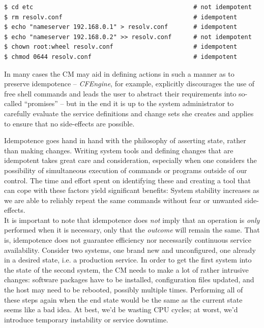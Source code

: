 \begin{lstlisting}[basicstyle=\scriptsize,float,label=code:cm:idempotence,caption={Idempotent and non-idempotent commands.}]
$ cd etc                                            # not idempotent
$ rm resolv.conf                                    # idempotent
$ echo "nameserver 192.168.0.1" > resolv.conf       # idempotent
$ echo "nameserver 192.168.0.2" >> resolv.conf      # not idempotent
$ chown root:wheel resolv.conf                      # idempotent
$ chmod 0644 resolv.conf                            # idempotent
\end{lstlisting}

In many cases the CM may aid in defining actions in
such a manner as to preserve idempotence -- {\em
CFEngine}, for example, explicitly discourages the use
of free shell commands and leads the user to abstract
their requirements into so-called
``promises''\cite{configuration-management:cfengine-manual}
-- but in the end it is up to the system administrator
to carefully evaluate the service definitions and
change sets she creates and applies to ensure that no
side-effects are possible.

Idempotence goes hand in hand with the philosophy of
asserting state, rather than making changes.  Writing
system tools and defining changes that are idempotent
takes great care and consideration, especially when
one considers the possibility of simultaneous
execution of commands or programs outside of our
control.  The time and effort spent on identifying
these and creating a tool that can cope with these
factors yield significant benefits: System stability
increases as we are able to reliably repeat the same
commands without fear or unwanted side-effects.  \\

It is important to note that idempotence does {\em
not} imply that an operation is {\em only} performed
when it is necessary, only that the {\em outcome} will
remain the same.  That is, idempotence does not
guarantee efficiency nor necessarily continuous
service availability.  Consider two systems, one brand
new and unconfigured, one already in a desired state,
i.e. a production service.  In order to get the first
system into the state of the second system, the CM
needs to make a lot of rather intrusive changes:
software packages have to be installed, configuration
files updated, and the host may need to be rebooted,
possibly multiple times.  Performing all of these
steps again when the end state would be the same as
the current state seems like a bad idea.  At best,
we'd be wasting CPU cycles; at worst, we'd introduce
temporary instability or service downtime.

